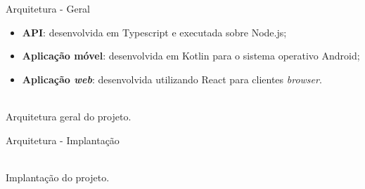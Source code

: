 \begin{frame}{Arquitetura - Geral}

\vspace*{-3em}

\begin{itemize}
	\item \textbf{API}: desenvolvida em Typescript e executada sobre Node.js;
	\item \textbf{Aplicação móvel}: desenvolvida em Kotlin para o sistema operativo Android;
	\item \textbf{Aplicação \textit{web}}: desenvolvida utilizando React para clientes \textit{browser}.
\end{itemize}

\centering
{}\\

{\small Arquitetura geral do projeto.}

\end{frame}







\begin{frame}{Arquitetura - Implantação}

\vspace*{-3em}

\centering
{}\\

{\small Implantação do projeto.}

\end{frame}